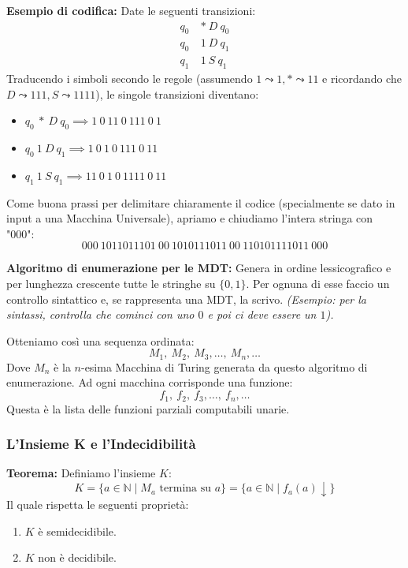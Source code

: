 \vspace{0.4cm}
\textbf{Esempio di codifica:}
Date le seguenti transizioni:
\begin{align*}
    q_0 \ &* \ D \ q_0 \\
    q_0 \ &1 \ D \ q_1 \\
    q_1 \ &1 \ S \ q_1
\end{align*}
Traducendo i simboli secondo le regole (assumendo $1 \leadsto 1, * \leadsto 11$ e ricordando che $D \leadsto 111, S \leadsto 1111$), le singole transizioni diventano:
\begin{itemize}
    \item $q_0 \ * \ D \ q_0 \implies 1 \ 0 \ 11 \ 0 \ 111 \ 0 \ 1$
    \item $q_0 \ 1 \ D \ q_1 \implies 1 \ 0 \ 1 \ 0 \ 111 \ 0 \ 11$
    \item $q_1 \ 1 \ S \ q_1 \implies 11 \ 0 \ 1 \ 0 \ 1111 \ 0 \ 11$
\end{itemize}
Come buona prassi per delimitare chiaramente il codice (specialmente se dato in input a una Macchina Universale), apriamo e chiudiamo l'intera stringa con "000":
$$ 000 \ 1011011101 \ 00 \ 1010111011 \ 00 \ 110101111011 \ 000 $$

\vspace{0.8cm}
\textbf{Algoritmo di enumerazione per le MDT:}
Genera in ordine lessicografico e per lunghezza crescente tutte le stringhe su $\{0, 1\}$.
Per ognuna di esse faccio un controllo sintattico e, se rappresenta una MDT, la scrivo.
\textit{(Esempio: per la sintassi, controlla che cominci con uno $0$ e poi ci deve essere un $1$).}

Otteniamo così una sequenza ordinata:
$$ M_1, \ M_2, \ M_3, \dots, \ M_n, \dots $$
Dove $M_n$ è la $n$-esima Macchina di Turing generata da questo algoritmo di enumerazione. Ad ogni macchina corrisponde una funzione:
$$ f_1, \ f_2, \ f_3, \dots, \ f_n, \dots $$
Questa è la lista delle funzioni parziali computabili unarie.

\vspace{0.6cm}
\subsubsection{L'Insieme K e l'Indecidibilità}

\textbf{Teorema:} Definiamo l'insieme $K$:
$$ K = \{a \in \mathbb{N} \mid M_a \text{ termina su } a\} = \{a \in \mathbb{N} \mid f_a(a)\downarrow\} $$
Il quale rispetta le seguenti proprietà:
\begin{enumerate}
    \item $K$ è semidecidibile.
    \item $K$ non è decidibile.
\end{enumerate}

